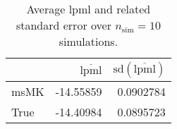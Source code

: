 \begin{table}[H]

\caption{Average lpml and related standard error over $n_{\text{sim}} = 10$ simulations.}
\centering
\begin{tabular}[t]{lrr}
\toprule
  & $\overbar{\text{lpml}}$ & $\text{sd}(\overbar{\text{lpml}})$\\
\midrule
msMK & -14.55859 & 0.0902784\\
True & -14.40984 & 0.0895723\\
\bottomrule
\end{tabular}
\end{table}